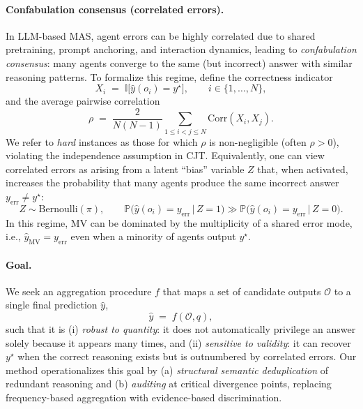 \documentclass{article}
\theoremstyle{plain}
\theoremstyle{definition}
\theoremstyle{remark}
\begin{document}
\paragraph{Confabulation consensus (correlated errors).}
In LLM-based MAS, agent errors can be highly correlated due to shared pretraining, prompt anchoring, and interaction dynamics,
leading to \emph{confabulation consensus}: many agents converge to the same (but incorrect) answer with similar reasoning patterns.
To formalize this regime, define the correctness indicator
\begin{equation}
\label{eq:Xi}
X_i \;=\; \mathbb{I}\big[\hat{y}(o_i)=y^\star\big], \qquad i\in\{1,\dots,N\},
\end{equation}
and the average pairwise correlation
\begin{equation}
\label{eq:rho}
\rho \;=\; \frac{2}{N(N-1)}\sum_{1\le i<j\le N}\mathrm{Corr}(X_i,X_j).
\end{equation}
We refer to \emph{hard} instances as those for which $\rho$ is non-negligible (often $\rho>0$), violating the independence
assumption in CJT. Equivalently, one can view correlated errors as arising from a latent ``bias'' variable $Z$ that, when activated,
increases the probability that many agents produce the same incorrect answer $y_{\mathrm{err}}\neq y^\star$:
\begin{equation}
\label{eq:latent_bias}
Z\sim \mathrm{Bernoulli}(\pi), \qquad
\mathbb{P}\big(\hat{y}(o_i)=y_{\mathrm{err}} \,\big|\, Z=1\big) \gg
\mathbb{P}\big(\hat{y}(o_i)=y_{\mathrm{err}} \,\big|\, Z=0\big).
\end{equation}
In this regime, MV can be dominated by the multiplicity of a shared error mode, i.e., $\hat{y}_{\mathrm{MV}}=y_{\mathrm{err}}$ even when
a minority of agents output $y^\star$.

\paragraph{Goal.}
We seek an aggregation procedure $f$ that maps a set of candidate outputs $\mathcal{O}$ to a single final prediction $\hat{y}$,
\begin{equation}
\hat{y} \;=\; f(\mathcal{O},q),
\end{equation}
such that it is (i) \emph{robust to quantity}: it does not automatically privilege an answer solely because it appears many times,
and (ii) \emph{sensitive to validity}: it can recover $y^\star$ when the correct reasoning exists but is outnumbered by correlated errors.
Our method operationalizes this goal by (a) \emph{structural semantic deduplication} of redundant reasoning and (b) \emph{auditing}
at critical divergence points, replacing frequency-based aggregation with evidence-based discrimination.
\end{document}
